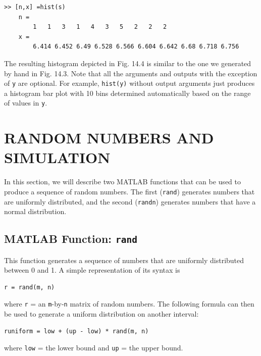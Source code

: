 \documentclass[../main.tex]{subfiles}
\begin{document}
\begin{lstlisting}[numbers=none]
	>> [n,x] =hist(s)
	n =	
		1	1	3	1	4	3	5	2	2	2
	x =
		6.414 6.452 6.49 6.528 6.566 6.604 6.642 6.68 6.718 6.756
\end{lstlisting}

The resulting histogram depicted in Fig. 14.4 is similar to the one we generated by hand in
Fig. 14.3. Note that all the arguments and outputs with the exception of \texttt{y} are optional. For
example, \texttt{hist(y)} without output arguments just produces a histogram bar plot with
10 bins determined automatically based on the range of values in \texttt{y}.

\label{cha:cha_P_14_2}
\section{RANDOM NUMBERS AND SIMULATION}
\noindent In this section, we will describe two MATLAB functions that can be used to produce a
sequence of random numbers. The first (\texttt{rand}) generates numbers that are uniformly
distributed, and the second (\texttt{randn}) generates numbers that have a normal distribution.

\label{cha:cha_P_14_2_1}
\subsection{MATLAB Function: \texttt{rand}}

\noindent This function generates a sequence of numbers that are uniformly distributed between 0
and 1. A simple representation of its syntax is

\begin{lstlisting}[numbers=none]
	r = rand(m, n)
\end{lstlisting}

\noindent where \texttt{r} = an \texttt{m}-by-\texttt{n} matrix of random numbers. The following formula can then be used
to generate a uniform distribution on another interval:

\begin{lstlisting}[numbers=none]
	runiform = low + (up - low) * rand(m, n)
\end{lstlisting}

\noindent where \texttt{low} = the lower bound and \texttt{up} = the upper bound.
\end{document}
